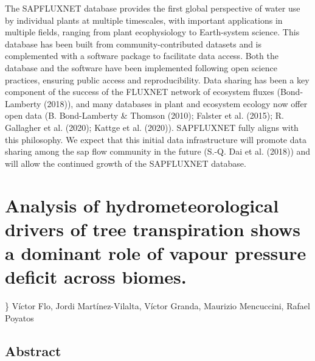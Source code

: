 \documentclass[11pt,twoside]{reedthesis}
\begin{document}
The SAPFLUXNET database provides the first global perspective of water
use by individual plants at multiple timescales, with important
applications in multiple fields, ranging from plant ecophysiology to
Earth-system science. This database has been built from
community-contributed datasets and is complemented with a software
package to facilitate data access. Both the database and the software
have been implemented following open science practices, ensuring public
access and reproducibility. Data sharing has been a key component of the
success of the FLUXNET network of ecosystem fluxes (Bond-Lamberty
(2018)), and many databases in plant and ecosystem ecology now offer
open data (B. Bond-Lamberty \& Thomson (2010); Falster et al. (2015); R.
Gallagher et al. (2020); Kattge et al. (2020)). SAPFLUXNET fully aligns
with this philosophy. We expect that this initial data infrastructure
will promote data sharing among the sap flow community in the future
(S.-Q. Dai et al. (2018)) and will allow the continued growth of the
SAPFLUXNET database.

\chapter[Analysis of hydrometeorological drivers.]{Analysis of hydrometeorological drivers of tree transpiration shows a dominant role of vapour pressure deficit across biomes.}

\} \setlength{\parindent}{0pt} Víctor Flo, Jordi Martínez-Vilalta,
Víctor Granda, Maurizio Mencuccini, Rafael Poyatos \newpage
\setlength{\parindent}{30pt}

\section*{Abstract}
\end{document}
